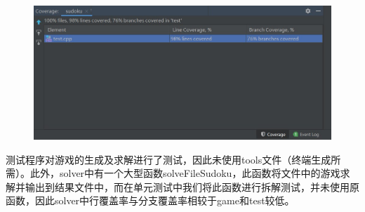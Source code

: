 \documentclass[a4paper]{article}
\begin{document}
\begin{figure}[H]
  \centering
  \includegraphics[scale=0.75]{images/cov_2.jpg}
  \label{fig:cov_2}
\end{figure}

测试程序对游戏的生成及求解进行了测试，因此未使用tools文件（终端生成所需）。此外，solver中有一个大型函数solveFileSudoku，此函数将文件中的游戏求解并输出到结果文件中，而在单元测试中我们将此函数进行拆解测试，并未使用原函数，因此solver中行覆盖率与分支覆盖率相较于game和test较低。
\end{document}
